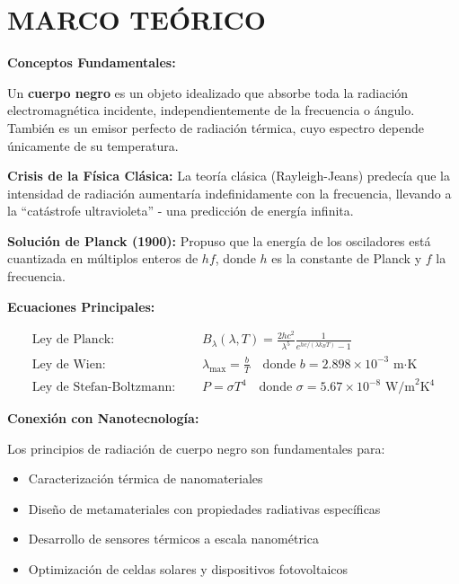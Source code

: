 \documentclass[12pt,a4paper]{article}
\begin{document}
	\section{MARCO TEÓRICO}
	
	\begin{teoriabox}
		\textbf{Conceptos Fundamentales:}
		
		Un \textbf{cuerpo negro} es un objeto idealizado que absorbe toda la radiación electromagnética incidente, independientemente de la frecuencia o ángulo. También es un emisor perfecto de radiación térmica, cuyo espectro depende únicamente de su temperatura.
		
		\textbf{Crisis de la Física Clásica:} La teoría clásica (Rayleigh-Jeans) predecía que la intensidad de radiación aumentaría indefinidamente con la frecuencia, llevando a la ``catástrofe ultravioleta'' - una predicción de energía infinita.
		
		\textbf{Solución de Planck (1900):} Propuso que la energía de los osciladores está cuantizada en múltiplos enteros de $hf$, donde $h$ es la constante de Planck y $f$ la frecuencia.
		
		\textbf{Ecuaciones Principales:}
		
		\begin{align}
			\text{Ley de Planck: } \quad & B_{\lambda}(\lambda, T) = \frac{2hc^{2}}{\lambda^{5}} \frac{1}{e^{hc/(\lambda k_{B}T)}-1} \\
			\text{Ley de Wien: } \quad & \lambda_{\text{max}} = \frac{b}{T} \quad \text{donde } b = 2.898 \times 10^{-3} \text{ m·K} \\
			\text{Ley de Stefan-Boltzmann: } \quad & P = \sigma T^4 \quad \text{donde } \sigma = 5.67 \times 10^{-8} \text{ W/m}^2\text{K}^4
		\end{align}
		
		\textbf{Conexión con Nanotecnología:}
		
		Los principios de radiación de cuerpo negro son fundamentales para:
		\begin{itemize}
			\item Caracterización térmica de nanomateriales
			\item Diseño de metamateriales con propiedades radiativas específicas
			\item Desarrollo de sensores térmicos a escala nanométrica
			\item Optimización de celdas solares y dispositivos fotovoltaicos
		\end{itemize}
	\end{teoriabox}
	
\end{document}
